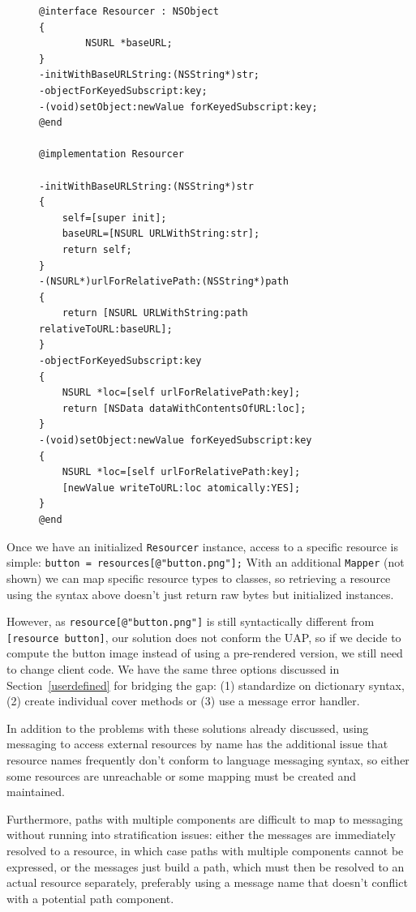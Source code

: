 \documentclass[preprint]{sigplanconf}
\begin{document}
\begin{figure}[htbp]
\begin{lstlisting}[style=numbers,label=resourcer,caption=Resourcer implementation]
@interface Resourcer : NSObject
{
        NSURL *baseURL;
}
-initWithBaseURLString:(NSString*)str;
-objectForKeyedSubscript:key;
-(void)setObject:newValue forKeyedSubscript:key;
@end

@implementation Resourcer

-initWithBaseURLString:(NSString*)str
{
    self=[super init];
    baseURL=[NSURL URLWithString:str];
    return self;
}
-(NSURL*)urlForRelativePath:(NSString*)path
{
    return [NSURL URLWithString:path relativeToURL:baseURL];
}
-objectForKeyedSubscript:key
{
    NSURL *loc=[self urlForRelativePath:key];
    return [NSData dataWithContentsOfURL:loc];
}
-(void)setObject:newValue forKeyedSubscript:key
{
    NSURL *loc=[self urlForRelativePath:key];
    [newValue writeToURL:loc atomically:YES];
}
@end
\end{lstlisting}
\end{figure}

Once we have an initialized {\tt Resourcer} instance, access to a specific resource
is  simple:   {\tt button = resources[@"button.png"];}   With an additional {\tt Mapper}
(not shown) we can map specific resource types to classes, so retrieving a 
resource using the syntax above doesn't just return raw bytes but initialized 
instances.  

However, as {\tt resource[@"button.png"]} is still syntactically different from {\tt [resource button]},
our solution does not conform the UAP, so if we decide to compute the button image instead
of using a pre-rendered version, we still need to change client code.   We have the same three options  discussed
in Section~\ref{userdefined} for bridging
the gap:  (1) standardize on dictionary syntax, (2) create individual cover methods or
(3) use a message error handler.  

In addition to the problems with these solutions already discussed,
using messaging to access external resources by name has the additional issue that 
resource names frequently don't conform to language messaging syntax, so either
some resources are unreachable or some mapping must be created and maintained.

Furthermore, paths with multiple components are difficult to map to messaging without
running into stratification issues:  either the messages are immediately resolved to
a resource, in which case paths with multiple components cannot be expressed, or
the messages just build a path, which must then be resolved to an actual resource
separately, preferably using a message name that doesn't conflict with a potential
path component. 
\end{document}

